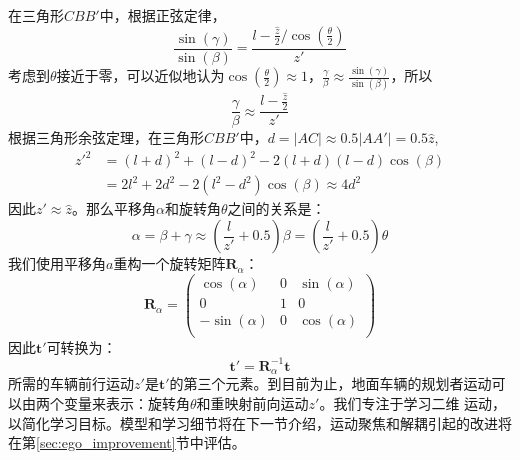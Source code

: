 在三角形$CBB'$中，根据正弦定律，
\begin{equation}
   \frac{\sin(\gamma)}{\sin(\beta)}  = \frac{l-\frac{\hat{z}}{2} / \cos(\frac{\theta}{2})}{z'} 
\end{equation}
考虑到$\theta$接近于零，可以近似地认为$\cos(\frac{\theta}{2}) \approx1$，$\frac{\gamma}{\beta} \approx\frac{\sin(\gamma)}{\sin(\beta)}$，所以
\begin{equation}
    \frac{\gamma}{\beta}  \approx \frac{l-\frac{\hat{z}}{2}}{z'} 
\end{equation}
根据三角形余弦定理，在三角形$CBB'$中，{$d = |AC| \approx 0.5|AA'| =0.5\hat{z}$}, 
\begin{equation}
    \begin{split}
        z'^2 &= (l+d)^2 + (l-d)^2- 2(l+d)(l-d)\cos(\beta) \\
        &= 2l^2+2d^2 - 2(l^2-d^2)\cos(\beta)\approx 4d^2
    \end{split}
\end{equation}
因此$z'\approx\hat{z}$。那么平移角$\alpha$和旋转角$\theta$之间的关系是：
\begin{equation}
    \alpha = \beta + \gamma \approx (\frac{l}{z'}+0.5)\beta =(\frac{l}{z'}+0.5)\theta
    \label{eq:r_t_ratio}
\end{equation}
我们使用平移角$a$重构一个旋转矩阵$\mathbf{R}_\alpha$：
\begin{equation}
    \mathbf{R}_\alpha = \begin{pmatrix}
        \cos(\alpha)& 0 & \sin(\alpha)\\ 
        0 & 1 & 0\\ 
        -\sin(\alpha)& 0 & \cos(\alpha)\\ 
    \end{pmatrix} 
    \label{eq:r_alpha}
\end{equation}
因此$\mathbf{t}'$可转换为：
\begin{equation}
    \mathbf{t}' = \mathbf{R}_\alpha^{-1}\mathbf{t}
    \label{eq:decouple_z}
\end{equation}
所需的车辆前行运动{$z'$}是$\mathbf{t}'$的第三个元素。到目前为止，地面车辆的规划者运动可以由两个变量来表示：旋转角$\theta$和{重映射}前向运动{$z'$}。我们专注于学习二维
运动，以简化学习目标。模型和学习细节将在下一节介绍，运动聚焦和解耦引起的改进将在第\ref{sec:ego_improvement}节中评估。


